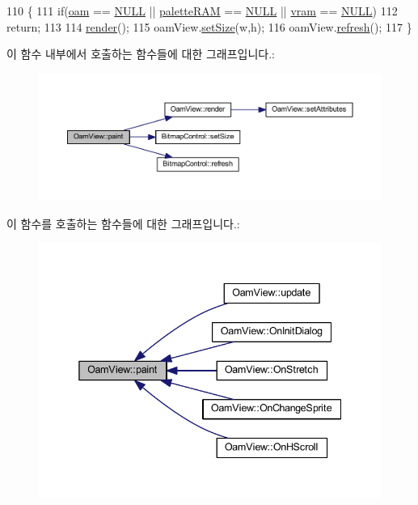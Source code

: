 \begin{DoxyCode}
110 \{
111   \textcolor{keywordflow}{if}(\mbox{\hyperlink{_globals_8cpp_ad09c638952cf2ac6103cfda7992422a7}{oam}} == \mbox{\hyperlink{getopt1_8c_a070d2ce7b6bb7e5c05602aa8c308d0c4}{NULL}} || \mbox{\hyperlink{_globals_8cpp_aea0283719ad27328f3cf5f883f58813e}{paletteRAM}} == \mbox{\hyperlink{getopt1_8c_a070d2ce7b6bb7e5c05602aa8c308d0c4}{NULL}} || \mbox{\hyperlink{_globals_8cpp_a983f8cd19ae66ea98e180c2e13bee5b9}{vram}} == \mbox{\hyperlink{getopt1_8c_a070d2ce7b6bb7e5c05602aa8c308d0c4}{NULL}})
112     \textcolor{keywordflow}{return};
113   
114   \mbox{\hyperlink{class_oam_view_a391d8ee2931b2927e936c7100e676451}{render}}();
115   oamView.\mbox{\hyperlink{class_bitmap_control_a421004fe6ba01329dd69259396592d1f}{setSize}}(w,h);
116   oamView.\mbox{\hyperlink{class_bitmap_control_acf061a1e9a4cad90ad2827c14f79caa2}{refresh}}();
117 \}
\end{DoxyCode}
이 함수 내부에서 호출하는 함수들에 대한 그래프입니다.\+:
\nopagebreak
\begin{figure}[H]
\begin{center}
\leavevmode
\includegraphics[width=350pt]{class_oam_view_af9092e04b559ef87670e18dd42c45669_cgraph}
\end{center}
\end{figure}
이 함수를 호출하는 함수들에 대한 그래프입니다.\+:
\nopagebreak
\begin{figure}[H]
\begin{center}
\leavevmode
\includegraphics[width=338pt]{class_oam_view_af9092e04b559ef87670e18dd42c45669_icgraph}
\end{center}
\end{figure}
\mbox{\label{class_oam_view_ade58501064b40396703757df105b944b}} 
